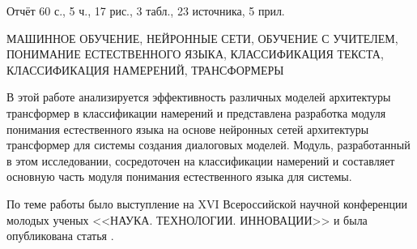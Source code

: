 Отчёт 60 с., 5 ч., 17 рис., 3 табл., 23 источника, 5 прил.


МАШИННОЕ ОБУЧЕНИЕ, НЕЙРОННЫЕ СЕТИ, ОБУЧЕНИЕ С УЧИТЕЛЕМ, ПОНИМАНИЕ ЕСТЕСТВЕННОГО ЯЗЫКА, КЛАССИФИКАЦИЯ ТЕКСТА, КЛАССИФИКАЦИЯ НАМЕРЕНИЙ, ТРАНСФОРМЕРЫ


В этой работе анализируется эффективность различных моделей архитектуры трансформер в классификации намерений и представлена разработка модуля понимания естественного языка на основе нейронных сетей архитектуры трансформер для системы создания диалоговых моделей. Модуль, разработанный в этом исследовании, сосредоточен на классификации намерений и составляет основную часть модуля понимания естественного языка для системы.

По теме работы было выступление на XVI Всероссийской научной конференции молодых ученых <<НАУКА. ТЕХНОЛОГИИ. ИННОВАЦИИ>> и была опубликована статья \cite{paper}.

